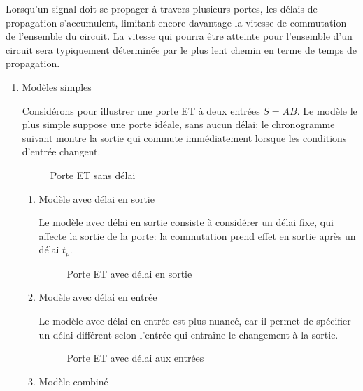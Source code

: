 \documentclass[11pt]{article}
\begin{document}
Lorsqu'un signal doit se propager à travers plusieurs portes, les
délais de propagation s'accumulent, limitant encore davantage la
vitesse de commutation de l'ensemble du circuit. La vitesse qui pourra
être atteinte pour l'ensemble d'un circuit sera typiquement déterminée
par le plus lent chemin en terme de temps de propagation.

\begin{enumerate}
\item Modèles simples
\label{sec:org9969316}

Considérons pour illustrer une porte ET à deux entrées \(S = A B\). 
Le modèle le plus simple suppose une porte idéale, sans aucun délai:
le chronogramme suivant montre la sortie qui commute immédiatement
lorsque les conditions d'entrée changent.

\begin{figure}[htbp]
\centering

\caption{\label{fig:orgd3e21fb}Porte ET sans délai}
\end{figure}

\begin{enumerate}
\item Modèle avec délai en sortie
\label{sec:org04055c1}

Le modèle avec délai en sortie consiste à considérer un délai fixe,
qui affecte la sortie de la porte: la commutation prend effet en
sortie après un délai \(t_p\).


\begin{figure}[htbp]
\centering

\caption{\label{fig:orgd1017ee}Porte ET avec délai en sortie}
\end{figure}

\item Modèle avec délai en entrée
\label{sec:org89b3d4a}

Le modèle avec délai en entrée est plus nuancé, car il permet de
spécifier un délai différent selon l'entrée qui entraîne le changement
à la sortie.

\begin{figure}[htbp]
\centering

\caption{\label{fig:org92f9e80}Porte ET avec délai aux entrées}
\end{figure}

\item Modèle combiné
\label{sec:orgd02b887}


\end{enumerate}
\end{enumerate}
\end{document}
